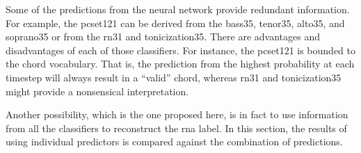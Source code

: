 
Some of the predictions from the neural network provide
redundant information. For example, the \gls{pcset121} can
be derived from the \gls{bass35}, \gls{tenor35},
\gls{alto35}, and \gls{soprano35} or from the \gls{rn31} and
\gls{tonicization35}. There are advantages and disadvantages
of each of those classifiers. For instance, the
\gls{pcset121} is bounded to the chord vocabulary. That is,
the prediction from the highest probability at each timestep
will always result in a ``valid'' chord, whereas \gls{rn31}
and \gls{tonicization35} might provide a nonsensical
interpretation.

Another possibility, which is the one proposed here, is in
fact to use information from all the classifiers to
reconstruct the \gls{rna} label. In this section, the
results of using individual predictors is compared against
the combination of predictions.
